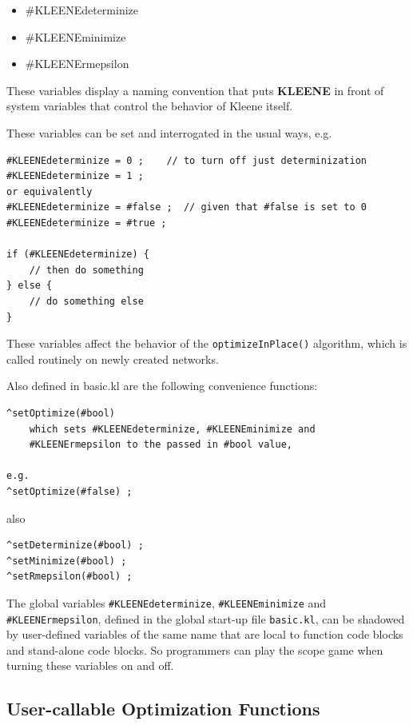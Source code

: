 \documentclass[letterpaper,12pt]{article}
\begin{document}
\begin{itemize}
\item
\#KLEENEdeterminize
\item
\#KLEENEminimize
\item
\#KLEENErmepsilon
\end{itemize}

\noindent
These variables display a naming convention that puts \textbf{KLEENE} in front
of system variables that control the behavior of Kleene itself.

These variables can be set and interrogated in the usual ways, e.g.

\begin{Verbatim}[fontsize=\small]
#KLEENEdeterminize = 0 ;	// to turn off just determinization
#KLEENEdeterminize = 1 ;
or equivalently
#KLEENEdeterminize = #false ;  // given that #false is set to 0
#KLEENEdeterminize = #true ;

if (#KLEENEdeterminize) {
    // then do something
} else {
    // do something else
}
\end{Verbatim}

\noindent 
These variables affect the behavior of the \texttt{optimizeInPlace()}
algorithm, which is called routinely on newly created networks.

Also defined in basic.kl are the following convenience functions:

\begin{Verbatim}[fontsize=\small]
^setOptimize(#bool)
	which sets #KLEENEdeterminize, #KLEENEminimize and
	#KLEENErmepsilon to the passed in #bool value, 
	
e.g.
^setOptimize(#false) ;
\end{Verbatim}

\noindent
also

\begin{Verbatim}[fontsize=\small]
^setDeterminize(#bool) ;
^setMinimize(#bool) ;
^setRmepsilon(#bool) ;
\end{Verbatim}

The global variables \verb!#KLEENEdeterminize!, \verb!#KLEENEminimize!
and \verb!#KLEENErmepsilon!, defined in the global start-up file
\texttt{basic.kl}, can be shadowed by user-defined variables of the same
name that are local to function code blocks and stand-alone code blocks.
So programmers can play the scope game when turning these variables on
and off.

\subsection{User-callable Optimization Functions}
\end{document}
